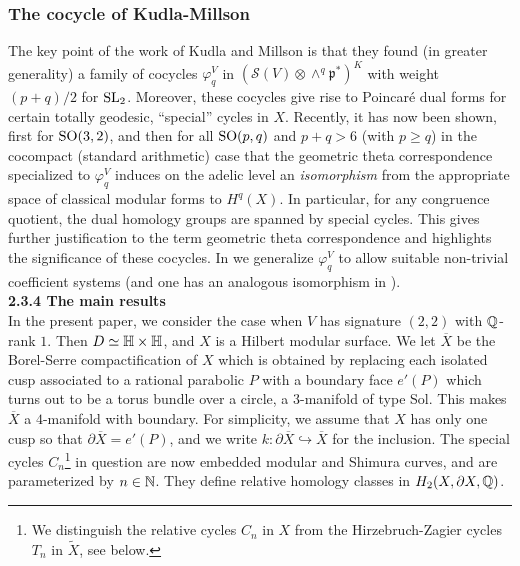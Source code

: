 \subsubsection*{The cocycle of Kudla-Millson}

The key point of the work of Kudla and Millson \cite{KM1,KM2} is
that they found (in greater generality) a family of cocycles
$\varphi^V_{q}$ in $(\mathcal{S}(V) \otimes \wedge^q
\mathfrak{p}^{\ast})^K$ with weight $(p+q)/2$ for $\operatorname{SL}_2$. Moreover,
these cocycles give rise to Poincar\'e dual forms for certain totally
geodesic, ``special'' cycles in $X$. Recently, it has now been
shown, first \cite{HoffmanHe} for $\operatorname{SO}(3,2)$, and then \cite{BMM}
for all $\operatorname{SO}(p,q)$ and $p+q>6$ (with $p \geq q$) in the cocompact
(standard arithmetic) case that the geometric theta correspondence
specialized to $\varphi_q^V$ induces on the adelic level an {\it
isomorphism} from the appropriate space of classical modular forms
to $H^q(X)$. In particular, for any congruence quotient, the dual
homology groups are spanned by special cycles. This gives further
justification to the term geometric theta correspondence and
highlights the significance of these cocycles. In \cite{FMcoeff}
we generalize $\varphi^V_{q}$ to allow suitable non-trivial coefficient
systems (and one has an analogous isomorphism in \cite{BMM}).
\\[12pt] 
\textbf{2.3.4 The main results} 
\\[10pt]
In the present paper, we consider the case when $V$ has signature
$(2,2)$ with $\mathbb{Q}$-rank $1$. Then $D \simeq \mathbb{H} \times \mathbb{H}$, and $X$
is a Hilbert modular surface. We let $\overline{X}$ be the Borel-Serre
compactification of $X$ which is obtained by replacing each isolated
cusp associated to a rational parabolic $P$ with a boundary face
$e'(P)$ which turns out to be a torus bundle over a circle, a
$3$-manifold of type Sol. This makes $\overline{X}$ a $4$-manifold
with boundary.  For simplicity, we assume that $X$ has only one
cusp so that $\partial \overline{X} = e'(P)$, and we write $k:
\partial \overline{X}  \hookrightarrow \overline{X}$ for the
inclusion. The special cycles $C_n$\footnote{We distinguish the
relative cycles $C_n$ in $X$ from the Hirzebruch-Zagier cycles $T_n$
in $\tilde{X}$, see below.} in question are now embedded modular
and Shimura curves, and are parameterized by $n \in \mathbb{N}$. They define
relative homology classes in $H_2(X, \partial X,\mathbb{Q})$.
